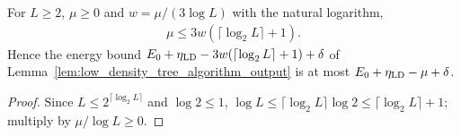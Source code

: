 \begin{lemma}
    \label{lem:low_density_source_buffer}
    \leanok
    For $L\ge2$, $\mu\ge0$ and $w=\mu/(3\log L)$ with the natural logarithm,
    \begin{align}
        \mu\le3w(\lceil\log_2L\rceil+1).
        \label{eq:low_density_source_buffer}
    \end{align}
    Hence the energy bound $E_0+\eta_{\rm LD}-3w(\lceil\log_2L\rceil+1)+\delta$
    of Lemma~\ref{lem:low_density_tree_algorithm_output} is at most
    $E_0+\eta_{\rm LD}-\mu+\delta$.
\end{lemma}
\begin{proof}\leanok
    Since $L\le2^{\lceil\log_2L\rceil}$ and $\log2\le1$,
    $\log L\le\lceil\log_2L\rceil\log2\le\lceil\log_2L\rceil+1$; multiply by
    $\mu/\log L\ge0$.
\end{proof}
